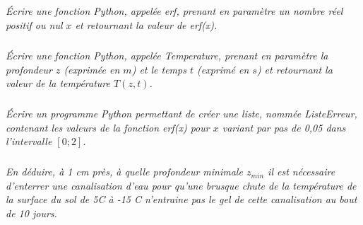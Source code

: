 \documentclass[10pt,oneside]{article}
\begin{document}
\subparagraph{}
\textit{Écrire une fonction Python, appelée \textsf{erf}, prenant en paramètre un nombre réel positif ou nul $x$ et retournant la valeur de \textsf{erf(x)}.}

\subparagraph{}
\textit{Écrire une fonction Python, appelée \textsf{Temperature}, prenant en paramètre la profondeur $z$ (exprimée en $m$) et le temps $t$ (exprimé en $s$) et retournant la valeur de la température $T(z, t)$.}

\subparagraph{}
\textit{Écrire un programme Python permettant de créer une liste, nommée \textsf{ListeErreur}, contenant les valeurs de la fonction \textsf{erf(x)} pour $x$ variant par pas de 0,05 dans l’intervalle $[0 ; 2]$.}

\subparagraph{}
\textit{En déduire, à 1 cm près, à quelle profondeur minimale $z_{min}$ il est nécessaire d'enterrer une canalisation d'eau pour qu'une brusque chute de la température de la surface du sol de 5\textdegree C à -15 \textdegree C n'entraine pas le gel de cette canalisation au bout de 10 jours.}
\end{document}
